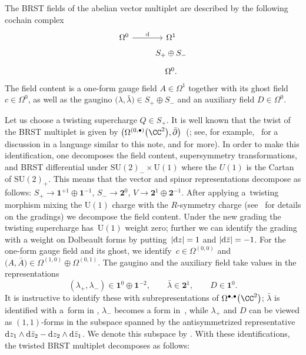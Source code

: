 \documentclass[pdftex]{sigma}
\numberwithin{equation}{section}
\theoremstyle{definition}
\def\d{{\rm d}}
\def\bu{\bullet}
\def\U{\ensuremath{\mathrm{U}}}
\begin{document}
The BRST fields of the abelian vector multiplet are described by the following cochain complex
\[%
 \begin{tikzcd}[row sep=tiny]
 \Omega^0 \arrow[r,"\d"] & \Omega^1 \\
 & S_+ \oplus S_- \\
 & \Omega^0.
 \end{tikzcd}
\]
The field content is a one-form gauge field $A \in \Omega^1$ together with its ghost field $c \in \Omega^0$, as well as the gaugino $\big(\lambda, \bar{\lambda}\big) \in S_+ \oplus S_-$ and an auxiliary field $D \in \Omega^0$.

Let us choose a twisting supercharge $Q \in S_+$. It is well known that the twist of the BRST multiplet is given by $\big(\Omega^{(0,\bu)}\big(\CC^2\big) , \bar{\partial}\big)$~(\cite{JohansenHet, nikitathesis}; see, for example,~\cite{SWchar} for a discussion in a language similar to this note, and \cite{Budzik:2023xbr,Budzik:2022mpd} for more). In order to make this identification, one decomposes the field content, supersymmetry transformations, and BRST differential under $\mathrm{SU}(2)_- \times \U(1)$ where the $U(1)$ is the Cartan of $\mathrm{SU}(2)_+$. This means that the vector and spinor representations decompose as follows:
$ S_+ \rightarrow \textbf{1}^{+1} \oplus \textbf{1}^{-1}$, $ S_- \rightarrow \textbf{2}^0$, $V \rightarrow \textbf{2}^1 \oplus \textbf{2}^{-1}$.
After applying a~twisting morphism mixing the $\U(1)$ charge with the $R$-symmetry charge (see~\cite{SWchar} for details on the gradings) we decompose the field content. Under the new grading the twisting supercharge has~$\U(1)$ weight zero; further we can identify the grading with a weight on Dolbeault forms by putting~${|\d z| =1}$ and $|\d \bar{z}|=-1$. For the one-form gauge field and its ghost, we identify~${
 c \in \Omega^{(0,0)}} $ and $ \big(A, \bar{A}\big) \in \Omega^{(1,0)} \oplus \Omega^{(0,1)}$.
The gaugino and the auxiliary field take values in the representations
\[
 (\lambda_+ , \lambda_-) \in \textbf{1}^{0} \oplus \textbf{1}^{-2}, \qquad \bar{\lambda} \in \textbf{2}^1, \qquad D \in \textbf{1}^0.
 \]
It is instructive to identify these with subrepresentations of $\Omega^{\bu,\bu}\big(\CC^2\big)$; $\bar{\lambda}$ is identified with a~form in , $\lambda_-$ becomes a form in~, while $\lambda_+$ and $D$ can be viewed as $(1,1)$-forms in the subspace spanned by the antisymmetrized representative~${\d z_1 \wedge \d \bar{z}_2 - \d z_2 \wedge \d \bar{z}_1}$. We denote this subspace by . With these identifications, the twisted BRST multiplet decomposes as follows:
\end{document}
